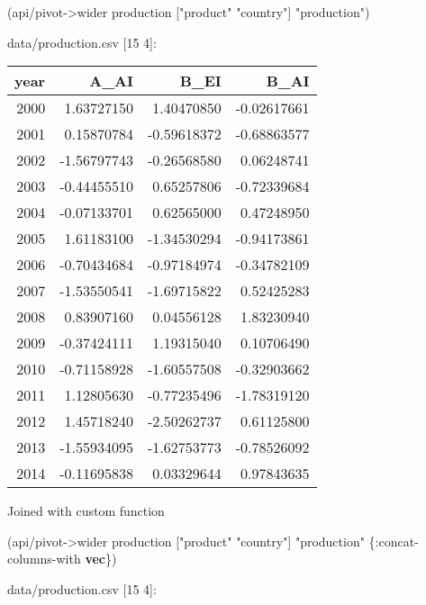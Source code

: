 \documentclass[]{article}
\newenvironment{Shaded}{\begin{snugshade}}{\end{snugshade}}
\newcommand{\KeywordTok}[1]{\textcolor[rgb]{0.13,0.29,0.53}{\textbf{#1}}}
\newcommand{\StringTok}[1]{\textcolor[rgb]{0.31,0.60,0.02}{#1}}
\newcommand{\AttributeTok}[1]{\textcolor[rgb]{0.77,0.63,0.00}{#1}}
\newcommand{\NormalTok}[1]{#1}
\begin{document}
\begin{Shaded}
\begin{Highlighting}[]
\NormalTok{(api/pivot->wider production [}\StringTok{"product"} \StringTok{"country"}\NormalTok{] }\StringTok{"production"}\NormalTok{)}
\end{Highlighting}
\end{Shaded}

data/production.csv {[}15 4{]}:

\begin{longtable}[]{@{}rrrr@{}}
\toprule
year & A\_AI & B\_EI & B\_AI\tabularnewline
\midrule
\endhead
2000 & 1.63727150 & 1.40470850 & -0.02617661\tabularnewline
2001 & 0.15870784 & -0.59618372 & -0.68863577\tabularnewline
2002 & -1.56797743 & -0.26568580 & 0.06248741\tabularnewline
2003 & -0.44455510 & 0.65257806 & -0.72339684\tabularnewline
2004 & -0.07133701 & 0.62565000 & 0.47248950\tabularnewline
2005 & 1.61183100 & -1.34530294 & -0.94173861\tabularnewline
2006 & -0.70434684 & -0.97184974 & -0.34782109\tabularnewline
2007 & -1.53550541 & -1.69715822 & 0.52425283\tabularnewline
2008 & 0.83907160 & 0.04556128 & 1.83230940\tabularnewline
2009 & -0.37424111 & 1.19315040 & 0.10706490\tabularnewline
2010 & -0.71158928 & -1.60557508 & -0.32903662\tabularnewline
2011 & 1.12805630 & -0.77235496 & -1.78319120\tabularnewline
2012 & 1.45718240 & -2.50262737 & 0.61125800\tabularnewline
2013 & -1.55934095 & -1.62753773 & -0.78526092\tabularnewline
2014 & -0.11695838 & 0.03329644 & 0.97843635\tabularnewline
\bottomrule
\end{longtable}

Joined with custom function

\begin{Shaded}
\begin{Highlighting}[]
\NormalTok{(api/pivot->wider production [}\StringTok{"product"} \StringTok{"country"}\NormalTok{] }\StringTok{"production"}\NormalTok{ \{}\AttributeTok{:concat-columns-with} \KeywordTok{vec}\NormalTok{\})}
\end{Highlighting}
\end{Shaded}

data/production.csv {[}15 4{]}:
\end{document}
